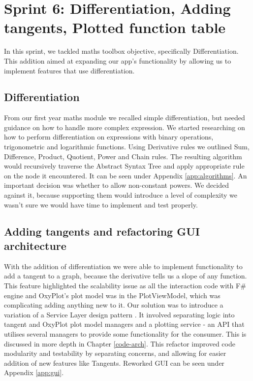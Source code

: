 \documentclass[a4paper, oneside, 11pt]{report}
\begin{document}
\section{Sprint 6: Differentiation, Adding tangents, Plotted function table}
In this sprint, we tackled maths toolbox objective, specifically Differentiation. This addition aimed at expanding our app's functionality by allowing us to implement features that use differentiation.

\subsection{Differentiation}
From our first year maths module we recalled simple differentiation, but needed guidance on how to handle more complex expression. We started researching on how to perform differentiation on expressions with binary operations, trigonometric and logarithmic functions. Using Derivative rules\cite{Derivatives} we outlined Sum, Difference, Product, Quotient, Power and Chain rules. The resulting algorithm would recursively traverse the Abstract Syntax Tree and apply appropriate rule on the node it encountered. It can be seen under Appendix \ref{app:algorithms}. An important decision was whether to allow non-constant powers. We decided against it, because supporting them would introduce a level of complexity we wasn't sure we would have time to implement and test properly.

\subsection{Adding tangents and refactoring GUI architecture}
With the addition of differentiation we were able to implement functionality to add a tangent to a graph, because the derivative tells us a slope of any function. This feature highlighted the scalability issue as all the interaction code with F\# engine and OxyPlot's plot model was in the PlotViewModel, which was complicating adding anything new to it. Our solution was to introduce a variation of a Service Layer design pattern \cite{ServiceLayer:Wiki}. It involved separating logic into tangent and OxyPlot plot model managers and a plotting service - an API that utilises several managers to provide some functionality for the consumer. This is discussed in more depth in Chapter \ref{code-arch}. This refactor improved code modularity and testability by separating concerns, and allowing for easier addition of new features like Tangents. Reworked GUI can be seen under Appendix \ref{app:gui}.
\end{document}
